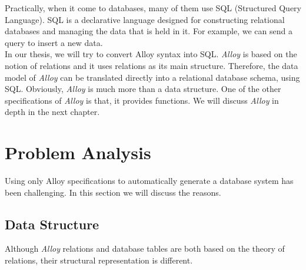 \documentclass[oneside]{book}
\begin{document}
Practically, when it come to databases, many of them use SQL (Structured Query Language). SQL is a declarative language designed for constructing relational databases and managing the data that is held in it. For example, we can send a query to insert a new data.\\

In our thesis, we will try to convert Alloy syntax into SQL. \textit{Alloy} is based on the notion of relations and it uses relations as its main structure. Therefore, the data model of \textit{Alloy} can be translated directly into a relational database schema, using SQL. Obviously, \textit{Alloy} is much more than a data structure. One of the other specifications of \textit{Alloy} is that, it provides functions. We will discuss \textit{Alloy} in depth in the next chapter.

\newpage

\section{Problem Analysis}

Using only Alloy specifications to automatically generate a database system has been challenging. In this section we will discuss the reasons. 

\subsection{Data Structure}

Although \textit{Alloy} relations and database tables are both based on the theory of relations, their structural representation is different.\\
\end{document}
